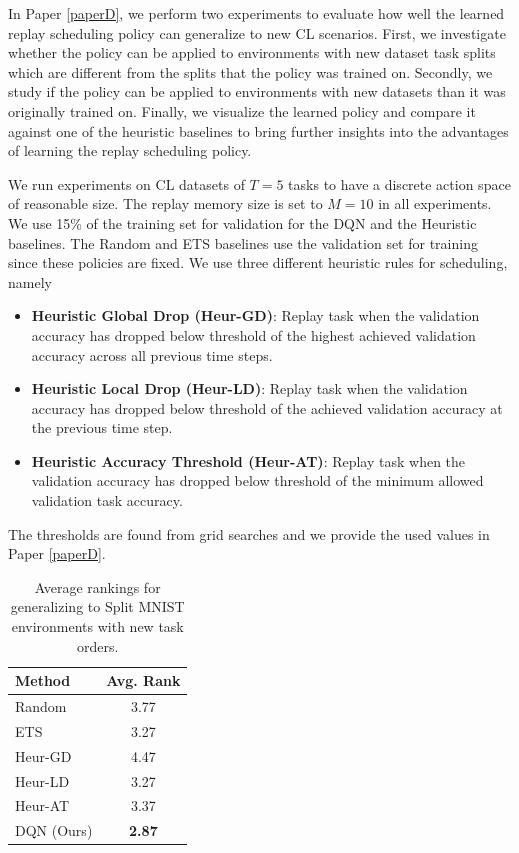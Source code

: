 In Paper \ref{paperD}, we perform two experiments to evaluate how well the learned replay scheduling policy can generalize to new CL scenarios. First, we investigate whether the policy can be applied to environments with new dataset task splits which are different from the splits that the policy was trained on. Secondly, we study if the policy can be applied to environments with new datasets than it was originally trained on. Finally, we visualize the learned policy and compare it against one of the heuristic baselines to bring further insights into the advantages of learning the replay scheduling policy.

We run experiments on CL datasets of $T=5$ tasks to have a discrete action space of reasonable size. The replay memory size is set to $M=10$ in all experiments. We use 15\% of the training set for validation for the DQN and the Heuristic baselines. The Random and ETS baselines use the validation set for training since these policies are fixed.  
We use three different heuristic rules for scheduling, namely
\begin{itemize}[itemsep=0em,topsep=1pt]
	\item \textbf{Heuristic Global Drop (Heur-GD)}: Replay task when the validation accuracy has dropped below threshold of the highest achieved validation accuracy across all previous time steps.
	
	\item \textbf{Heuristic Local Drop (Heur-LD)}: Replay task when the validation accuracy has dropped below threshold of the achieved validation accuracy at the previous time step.
	
	\item \textbf{Heuristic Accuracy Threshold (Heur-AT)}: Replay task when the validation accuracy has dropped below threshold of the minimum allowed validation task accuracy. 
\end{itemize}
The thresholds are found from grid searches and we provide the used values in Paper \ref{paperD}. 

\vspace{-2mm}
\begin{table}
	\footnotesize
	\vspace{-5mm}
	\captionsetup{width=.84\linewidth}
	\caption{Average rankings for generalizing to Split MNIST environments with new task orders. 
	}
	\label{tab:avg_ranking_split_mnist_new_task_orders}
	\vspace{-7mm}
	\begin{tabular}{l c} \\
		\toprule  
		{\bf Method} & {\bf Avg. Rank} \\ 
		\midrule
		Random 		& 3.77 \\
		ETS 		& 3.27 \\
		Heur-GD 	& 4.47 \\
		Heur-LD 	& 3.27 \\
		Heur-AT 	& 3.37 \\
		\midrule
		DQN (Ours)		& {\bf 2.87} \\
		\bottomrule
	\end{tabular}
\end{table} 
